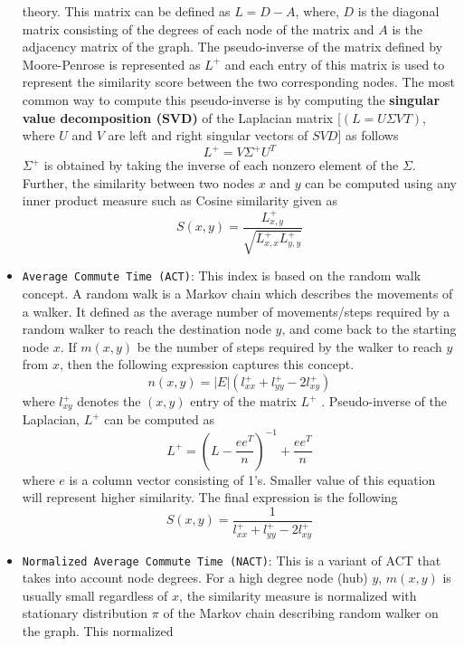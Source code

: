 \begin{itemize}
          theory. This matrix can be defined as \(L = D - A\), where, \(D\) is the
          diagonal matrix consisting of the degrees of each node of the matrix and
          \(A\) is the adjacency matrix of the graph. The pseudo-inverse of the
          matrix defined by Moore-Penrose is represented as \(L^+\) and each entry
          of this matrix is used to represent the similarity score between the two
          corresponding nodes. The most common way to compute this pseudo-inverse
          is by computing the \textbf{singular value decomposition (SVD)} of the
          Laplacian matrix [$(L = U \Sigma V^{}T)$, where \(U\) and \(V\)
                  are left and right singular vectors of \(SVD\)] as follows
          \[L^+ = V \Sigma^+ U^T\] \(\Sigma^+\) is obtained by taking the inverse
          of each nonzero element of the \(\Sigma\). Further, the similarity
          between two nodes \(x\) and \(y\) can be computed using any inner
          product measure such as Cosine similarity given as
          \[S(x, y) = \frac{L_{x, y}^+}{\sqrt{L_{x, x}^+ L_{y, y}^+}}\]
    \item \texttt{Average\ Commute\ Time\ (ACT)}: This index is based on the
          random walk concept. A random walk is a Markov chain which describes the
          movements of a walker. It defined as the average number of
          movements/steps required by a random walker to reach the destination
          node \(y\), and come back to the starting node \(x\). If \(m(x, y)\) be
          the number of steps required by the walker to reach \(y\) from \(x\),
          then the following expression captures this concept.
          \[n(x, y) = |E| (l_{xx}^+ + l_{yy}^+ - 2l_{xy}^+) \] where \(l_{xy}^+\)
          denotes the \((x, y)\) entry of the matrix \(L^+\) . Pseudo-inverse of
          the Laplacian, \(L^+\) can be computed as
          \[L^+ = (L - \frac{ee^T}{n})^{-1} + \frac{ee^T}{n}\] where \(e\) is a
          column vector consisting of 1's. Smaller value of this equation will
          represent higher similarity. The final expression is the following
          \[S(x, y) = \frac{1}{l_{xx}^+ + l_{yy}^+ - 2l_{xy}^+}\]
    \item \texttt{Normalized\ Average\ Commute\ Time\ (NACT)}: This is a variant
          of ACT that takes into account node degrees. For a high degree node
          (hub) \(y\), \(m(x, y)\) is usually small regardless of \(x\), the
          similarity measure is normalized with stationary distribution \(\pi\) of
          the Markov chain describing random walker on the graph. This normalized

\end{itemize}
